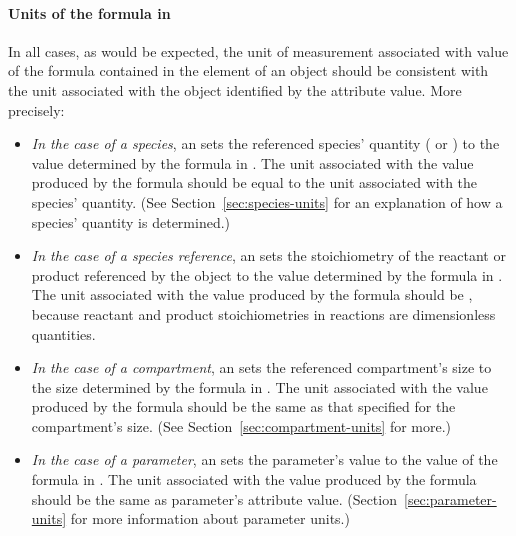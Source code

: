 \paragraph{Units of the  formula in }

In all cases, as would be expected, the unit of measurement
associated with value of the formula contained in the 
element of an \EventAssignment object should be consistent with
the unit associated with the object identified by the
 attribute value.  More precisely:
\begin{itemize}
  
\item \emph{In the case of a species}, an \EventAssignment sets
  the referenced species' quantity ( or
  ) to the value determined by the formula in
  .  The unit associated with the value produced by
  the  formula should be equal to the unit associated
  with the species' quantity.  (See
  Section~\ref{sec:species-units} for an explanation of how a
  species' quantity is determined.)

\item \emph{In the case of a species reference}, an
  \EventAssignment sets the stoichiometry of the reactant or
  product referenced by the \SpeciesReference object to the value
  determined by the formula in .  The unit associated
  with the value produced by the  formula should be
  , because reactant and product
  stoichiometries in reactions are dimensionless quantities.

\item \emph{In the case of a compartment}, an \EventAssignment
  sets the referenced compartment's size to the size determined by
  the formula in .  The unit associated with the value
  produced by the  formula should be the same as that
  specified for the compartment's size.  (See
  Section~\ref{sec:compartment-units} for more.)

\item \emph{In the case of a parameter}, an \EventAssignment sets
  the parameter's value to the value of the formula in
  .  The unit associated with the value produced by
  the  formula should be the same as parameter's
   attribute value.
  (Section~\ref{sec:parameter-units} for more information about
  parameter units.)

\end{itemize}

